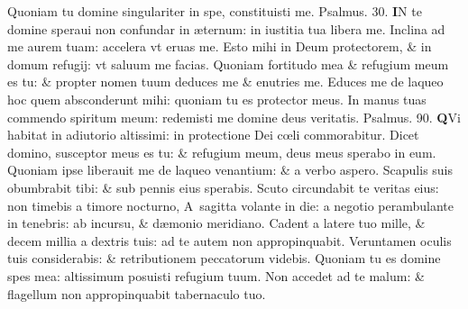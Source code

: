 \documentclass[a5paper,10pt]{book}
\def\ae{æ}
\def\oe{œ}
\begin{document}
\begin{multicols*}{2}
\newline \color{red} Q\color{black}uoniam tu domine singulariter in spe, constituisti me. \quad \color{red} Psalmus. \hypertarget{ps30.1}{30.} \color{black}
\lettrine[lines=2]{\bfseries \color{red} I}{}N te domine speraui non confundar in \ae ternum: in iustitia tua libera me.
\newline \color{red} I\color{black}nclina ad me aurem tuam: accelera vt eruas me.
\newline \color{red} E\color{black}sto mihi in Deum protectorem, \& in domum refugij: vt saluum me facias.
\newline \color{red} Q\color{black}uoniam fortitudo mea \& refugium meum es tu: \& propter nomen tuum deduces me \& enutries me.
\newline \color{red} E\color{black}duces me de laqueo hoc quem absconderunt mihi: quoniam tu es protector meus.
\newline \color{red} I\color{black}n manus tuas commendo spiritum meum: redemisti me domine deus veritatis. \quad \color{red} Psalmus. \hypertarget{ps90}{90.} \color{black}
\lettrine[lines=2]{\bfseries \color{red} Q}{}Vi habitat in adiutorio altissimi: in protectione Dei c\oe li commorabitur.
\newline \color{red} D\color{black}icet domino, susceptor meus es tu: \& refugium meum, deus meus sperabo in eum.
\newline \color{red} Q\color{black}uoniam ipse liberauit me de laqueo venantium: \& a verbo aspero.
\newline \color{red} S\color{black}capulis suis obumbrabit tibi: \& sub pennis eius sperabis.
\newline \color{red} S\color{black}cuto circundabit te veritas eius: non timebis a timore nocturno,
\newline \color{red} A\color{black}\ sagitta volante in die: a negotio perambulante in tenebris: ab incursu, \& d\ae monio meridiano.
\newline \color{red} C\color{black}adent a latere tuo mille, \& decem millia a dextris tuis: ad te autem non appropinquabit.
\newline \color{red} V\color{black}eruntamen oculis tuis considerabis: \& retributionem peccatorum videbis.
\newline \color{red} Q\color{black}uoniam tu es domine spes mea: altissimum posuisti refugium tuum.
\newline \color{red} N\color{black}on accedet ad te malum: \& flagellum non appropinquabit tabernaculo tuo.

\end{multicols*}
\end{document}
